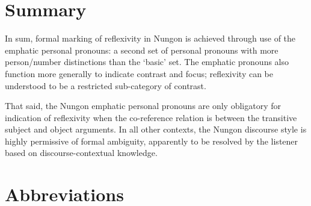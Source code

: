 \documentclass[output=paper,colorlinks,citecolor=brown]{langscibook}
\begin{document}
\section{Summary}\label{sec:sarvasy:5}

In sum, formal marking of reflexivity in Nungon is achieved through use of the emphatic personal pronouns: a second set of personal pronouns with more person/number distinctions than the ‘basic’ set. The emphatic pronouns also function more generally to indicate contrast and focus; reflexivity can be understood to be a restricted sub-category of contrast. 

That said, the Nungon emphatic personal pronouns are only obligatory for indication of reflexivity when the co-reference relation is between the transitive subject and object arguments. In all other contexts, the Nungon discourse style is highly permissive of formal ambiguity, apparently to be resolved by the listener based on discourse-contextual knowledge.

\section*{Abbreviations}
\end{document}
